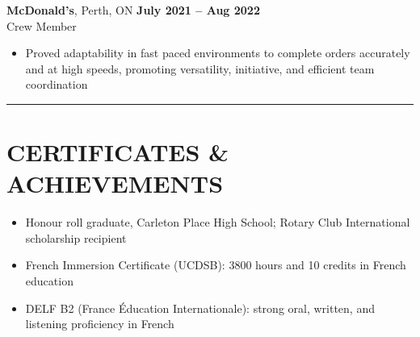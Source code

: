 \documentclass[10pt]{article}
\begin{document}
\textbf{McDonald's}, Perth, ON \hfill \textbf{July 2021 -- Aug 2022}\\
Crew Member
\begin{itemize}
\item Proved adaptability in fast paced environments to complete orders accurately and at high speeds, promoting versatility, initiative, and efficient team coordination
\end{itemize}

\vspace{4pt}
\hrule
\vspace{6pt}

\section*{CERTIFICATES \& ACHIEVEMENTS}
\begin{itemize}
\item Honour roll graduate, Carleton Place High School; Rotary Club International scholarship recipient
\item French Immersion Certificate (UCDSB): 3800 hours and 10 credits in French education
\item DELF B2 (France Éducation Internationale): strong oral, written, and listening proficiency in French
\end{itemize}
\end{document}
